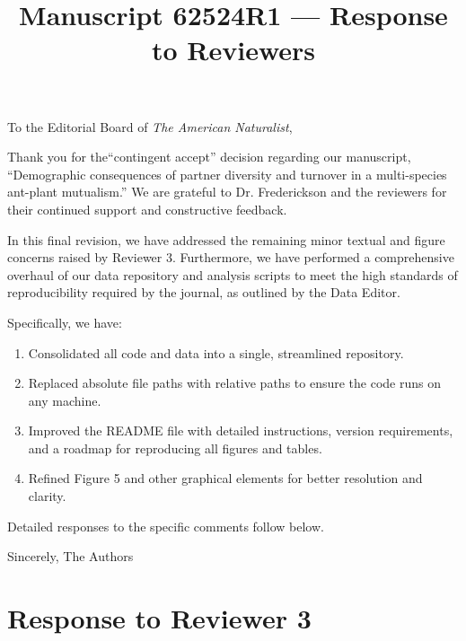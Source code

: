 \documentclass[12pt]{article}
\begin{document}
	
	\title{Manuscript 62524R1 --- Response to Reviewers}
	\date{}
	\maketitle
	
	\noindent To the Editorial Board of \emph{The American Naturalist},
	
	Thank you for the``contingent accept'' decision regarding our manuscript, ``Demographic consequences of partner diversity and turnover in a multi-species ant-plant mutualism.'' We are grateful to Dr. Frederickson and the reviewers for their continued support and constructive feedback.
	
	In this final revision, we have addressed the remaining minor textual and figure concerns raised by Reviewer 3. Furthermore, we have performed a comprehensive overhaul of our data repository and analysis scripts to meet the high standards of reproducibility required by the journal, as outlined by the Data Editor. 
	
	Specifically, we have:
	\begin{enumerate}
		\item Consolidated all code and data into a single, streamlined repository.
		\item Replaced absolute file paths with relative paths to ensure the code runs on any machine.
		\item Improved the README file with detailed instructions, version requirements, and a roadmap for reproducing all figures and tables.
		\item Refined Figure 5 and other graphical elements for better resolution and clarity.
	\end{enumerate}
	
	Detailed responses to the specific comments follow below.
	
	\vspace{2em}
	\hfill Sincerely,
	\hfill The Authors
	
	\newpage
	
	\section{Response to Reviewer 3}
	
\end{document}
